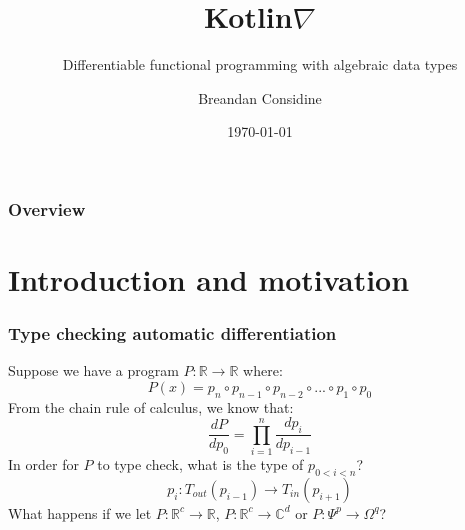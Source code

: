 \documentclass{beamer}
\title{Kotlin\texorpdfstring{$\nabla$}{}}
\subtitle{Differentiable functional programming with algebraic data types}
\author{Breandan Considine}
\institute[UdeM]{
Universit\'e de Montr\'eal \\
\medskip
\textit{breandan.considine@umontreal.ca}
}
\date{\today}
\begin{document}
    \begin{frame}
        \titlepage
    \end{frame}

    \begin{frame}
        \frametitle{Overview}
        \tableofcontents
    \end{frame}

    \section{Introduction and motivation}\label{sec:first-section}


    \begin{frame}
        \frametitle{Type checking automatic differentiation}
        Suppose we have a program $P: \mathbb{R}\rightarrow\mathbb{R}$ where:
        \begin{equation}
            P(x)=p_n \circ p_{n-1} \circ p_{n-2} \circ ... \circ p_1 \circ p_0
        \end{equation}
        From the chain rule of calculus, we know that:
        \begin{equation}
            \frac{dP}{dp_0} = {\displaystyle \prod_{i=1}^{n} \frac{dp_{i}}{dp_{i-1}}}
        \end{equation}
        In order for $P$ to type check, what is the type of $p_{0<i<n}$?
        \begin{equation}
            p_i: T_{out}(p_{i-1}) \rightarrow T_{in}(p_{i+1})
        \end{equation}
        What happens if we let $P: \mathbb{R}^c\rightarrow\mathbb{R}$, $P: \mathbb{R}^c\rightarrow\mathbb{C}^d$  or $P: \Psi^p\rightarrow\Omega^q$?
    \end{frame}

\end{document}

